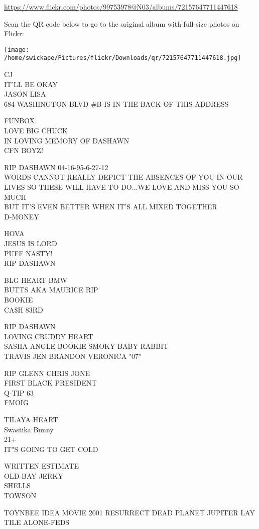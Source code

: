 \documentclass[10pt,letterpaper]{article}
\begin{document}
\url{https://www.flickr.com/photos/99753978@N03/albums/72157647711447618}

Scan the QR code below to go to the original album with full-size photos on Flickr:

\texttt{[image: /home/swickape/Pictures/flickr/Downloads/qr/72157647711447618.jpg]}


CJ\\
IT'LL BE OKAY\\
JASON LISA\\
684 WASHINGTON BLVD \#B IS IN THE BACK OF THIS ADDRESS

FUNBOX\\
LOVE BIG CHUCK\\
IN LOVING MEMORY OF DASHAWN\\
CFN BOYZ!

RIP DASHAWN 04{-}16{-}95{-}6{-}27{-}12\\
WORDS CANNOT REALLY DEPICT THE ABSENCES OF YOU IN OUR LIVES SO THESE WILL HAVE TO DO...WE LOVE AND MISS YOU SO MUCH\\
BUT IT'S EVEN BETTER WHEN IT'S ALL MIXED TOGETHER\\
D{-}MONEY

HOVA\\
JESUS IS LORD\\
PUFF NASTY!\\
RIP DASHAWN

BLG HEART BMW\\
BUTTS AKA MAURICE RIP\\
BOOKIE\\
CA\$H 83RD

RIP DASHAWN\\
LOVING CRUDDY HEART\\
SASHA ANGLE BOOKIE SMOKY BABY RABBIT\\
TRAVIS JEN BRANDON VERONICA "07"

RIP GLENN CHRIS JONE\\
FIRST BLACK PRESIDENT\\
Q{-}TIP 63\\
FMOIG

TILAYA HEART\\
Swastika Bunny\\
21+\\
IT"S GOING TO GET COLD

WRITTEN ESTIMATE\\
OLD BAY JERKY\\
SHELLS\\
TOWSON

TOYNBEE IDEA MOVIE 2001 RESURRECT DEAD PLANET JUPITER LAY TILE ALONE{-}FEDS
\end{document}
